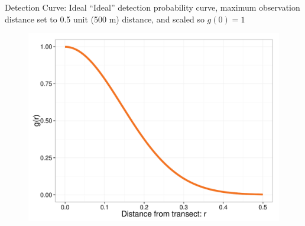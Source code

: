 \documentclass{beamer}
\begin{document}
\begin{frame}{Detection Curve: Ideal}
``Ideal'' detection probability curve, maximum observation distance set to 0.5 unit (500 m) distance, and scaled so $g(0)=1$
	\begin{figure}
		\centering
		\includegraphics[height=.75\textheight]{../images/detectionCurveScaled.pdf}
	\end{figure}
\end{frame}
\end{document}
